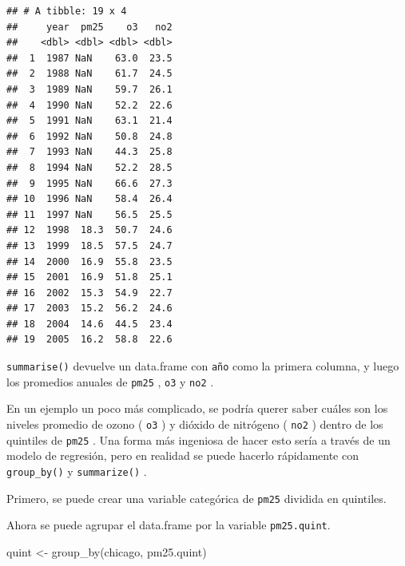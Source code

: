 \documentclass[
]{book}
\newenvironment{Shaded}{\begin{snugshade}}{\end{snugshade}}
\newcommand{\AttributeTok}[1]{\textcolor[rgb]{0.77,0.63,0.00}{#1}}
\newcommand{\ConstantTok}[1]{\textcolor[rgb]{0.00,0.00,0.00}{#1}}
\newcommand{\DecValTok}[1]{\textcolor[rgb]{0.00,0.00,0.81}{#1}}
\newcommand{\FloatTok}[1]{\textcolor[rgb]{0.00,0.00,0.81}{#1}}
\newcommand{\FunctionTok}[1]{\textcolor[rgb]{0.00,0.00,0.00}{#1}}
\newcommand{\NormalTok}[1]{#1}
\newcommand{\OtherTok}[1]{\textcolor[rgb]{0.56,0.35,0.01}{#1}}
\newcommand{\SpecialCharTok}[1]{\textcolor[rgb]{0.00,0.00,0.00}{#1}}
\begin{document}
\begin{verbatim}
## # A tibble: 19 x 4
##     year  pm25    o3   no2
##    <dbl> <dbl> <dbl> <dbl>
##  1  1987 NaN    63.0  23.5
##  2  1988 NaN    61.7  24.5
##  3  1989 NaN    59.7  26.1
##  4  1990 NaN    52.2  22.6
##  5  1991 NaN    63.1  21.4
##  6  1992 NaN    50.8  24.8
##  7  1993 NaN    44.3  25.8
##  8  1994 NaN    52.2  28.5
##  9  1995 NaN    66.6  27.3
## 10  1996 NaN    58.4  26.4
## 11  1997 NaN    56.5  25.5
## 12  1998  18.3  50.7  24.6
## 13  1999  18.5  57.5  24.7
## 14  2000  16.9  55.8  23.5
## 15  2001  16.9  51.8  25.1
## 16  2002  15.3  54.9  22.7
## 17  2003  15.2  56.2  24.6
## 18  2004  14.6  44.5  23.4
## 19  2005  16.2  58.8  22.6
\end{verbatim}

\texttt{summarise()} devuelve un data.frame con \texttt{año} como la primera columna, y luego los promedios anuales de \texttt{pm25} , \texttt{o3} y \texttt{no2} .

En un ejemplo un poco más complicado, se podría querer saber cuáles son los niveles promedio de ozono ( \texttt{o3} ) y dióxido de nitrógeno ( \texttt{no2} ) dentro de los quintiles de \texttt{pm25} . Una forma más ingeniosa de hacer esto sería a través de un modelo de regresión, pero en realidad se puede hacerlo rápidamente con \texttt{group\_by()} y \texttt{summarize()} .

Primero, se puede crear una variable categórica de \texttt{pm25} dividida en quintiles.

\begin{Shaded}
\end{Shaded}

Ahora se puede agrupar el data.frame por la variable \texttt{pm25.quint}.

\begin{Shaded}
\begin{Highlighting}[]
\NormalTok{quint }\OtherTok{\textless{}{-}} \FunctionTok{group\_by}\NormalTok{(chicago, pm25.quint)}
\end{Highlighting}
\end{Shaded}
\end{document}
